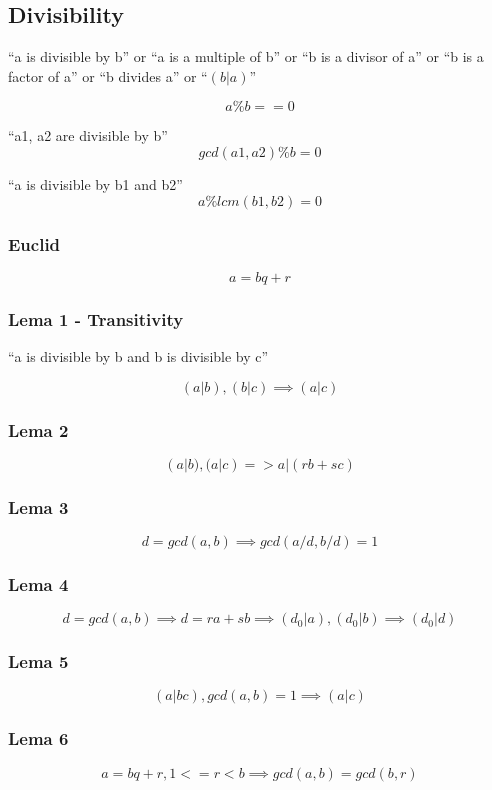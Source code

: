 \subsection{Divisibility}
	
	``a is divisible by b'' or
	``a is a multiple of b'' or
	``b is a divisor of a'' or
	``b is a factor of a'' or
	``b divides a'' or
	``$(b | a)$''

	$$ a \% b == 0 $$

	``a1, a2 are divisible by b''
	$$ gcd(a1, a2) \% b = 0 $$

	``a is divisible by b1 and b2''
	$$ a \% lcm(b1, b2) = 0 $$
	
	\subsubsection{Euclid}
	$$ a = bq + r $$

	\subsubsection{Lema 1 - Transitivity}

	``a is divisible by b and b is divisible by c''

	$$ (a | b) , (b | c)  \implies (a | c) $$

	\subsubsection{Lema 2}
	$$ (a | b) , (a | c) => a | (rb + sc) $$

	\subsubsection{Lema 3}
	$$ d = gcd(a, b) \implies gcd(a/d, b/d) = 1 $$

	\subsubsection{Lema 4}
	$$ d = gcd(a, b) \implies d = ra + sb \implies (d_0 | a), (d_0 | b) \implies (d_0 | d) $$
	
	\subsubsection{Lema 5}
	$$ (a | bc), gcd(a, b) = 1 \implies (a | c) $$

	\subsubsection{Lema 6}
	$$ a = bq+r, {1 <= r < b} \implies gcd(a, b) = gcd(b, r) $$
	
